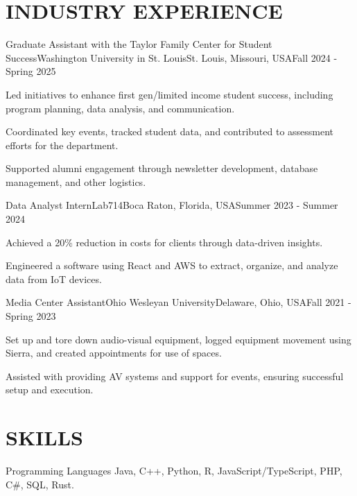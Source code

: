 \vspace{\headerSpacing}
\section{INDUSTRY EXPERIENCE}

\begin{experienceentry}{Graduate Assistant with the Taylor Family Center for Student Success}{Washington University in St. Louis}{St. Louis, Missouri, USA}{Fall 2024 - Spring 2025}
    \item Led initiatives to enhance first gen/limited income student success, including program planning, data analysis, and communication.
    \item Coordinated key events, tracked student data, and contributed to assessment efforts for the department.
    \item Supported alumni engagement through newsletter development, database management, and other logistics.
\end{experienceentry}

\begin{experienceentry}{Data Analyst Intern}{Lab714}{Boca Raton, Florida, USA}{Summer 2023 - Summer 2024}
    \item Achieved a 20\% reduction in costs for clients through data-driven insights.
    \item Engineered a software using React and AWS to extract, organize, and analyze data from IoT devices.
\end{experienceentry}

\begin{experienceentry}{Media Center Assistant}{Ohio Wesleyan University}{Delaware, Ohio, USA}{Fall 2021 - Spring 2023}
    \item Set up and tore down audio-visual equipment, logged equipment movement using Sierra, and created appointments for use of spaces.
    \item Assisted with providing AV systems and support for events, ensuring successful setup and execution.
\end{experienceentry}

\vspace{\headerSpacing}
\section{SKILLS}

\begin{skillcategory}{Programming Languages}
    Java, C++, Python, R, JavaScript/TypeScript, PHP, C\#, SQL, Rust.
\end{skillcategory}

